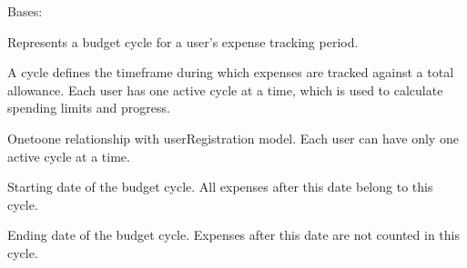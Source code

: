 \documentclass[letterpaper,10pt,english]{sphinxmanual}
\begin{document}
\begin{fulllineitems}
\label{\detokenize{expensesApp:expensesApp.models.Cycle}}
\pysigstartsignatures
\pysiglinewithargsret
{}
{\sphinxparamcomma {}}
{}
\pysigstopsignatures
\sphinxAtStartPar
Bases: 

\sphinxAtStartPar
Represents a budget cycle for a user’s expense tracking period.

\sphinxAtStartPar
A cycle defines the timeframe during which expenses are tracked against
a total allowance. Each user has one active cycle at a time, which is
used to calculate spending limits and progress.

\begin{fulllineitems}
\label{\detokenize{expensesApp:expensesApp.models.Cycle.user}}
\pysigstartsignatures
\pysigline
{}
\pysigstopsignatures
\sphinxAtStartPar
One\sphinxhyphen{}to\sphinxhyphen{}one relationship with userRegistration model.
Each user can have only one active cycle at a time.

\end{fulllineitems}


\begin{fulllineitems}
\label{\detokenize{expensesApp:expensesApp.models.Cycle.start_date}}
\pysigstartsignatures
\pysigline
{}
\pysigstopsignatures
\sphinxAtStartPar
Starting date of the budget cycle.
All expenses after this date belong to this cycle.

\end{fulllineitems}


\begin{fulllineitems}
\label{\detokenize{expensesApp:expensesApp.models.Cycle.end_date}}
\pysigstartsignatures
\pysigline
{}
\pysigstopsignatures
\sphinxAtStartPar
Ending date of the budget cycle.
Expenses after this date are not counted in this cycle.


\end{fulllineitems}
\end{fulllineitems}
\end{document}
